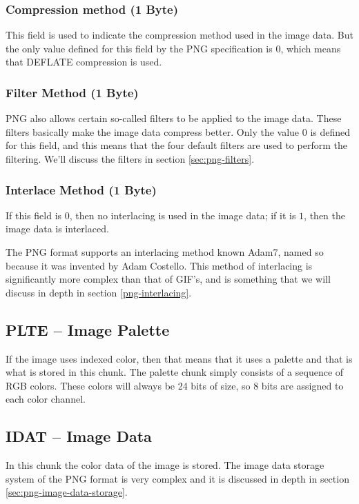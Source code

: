 \subsubsection*{Compression method (1 Byte)}

This field is used to indicate the compression method used in the
image data. But the only value defined for this field by the PNG
specification is $0$, which means that DEFLATE compression is used.

\subsubsection*{Filter Method (1 Byte)}

PNG also allows certain so-called filters to be applied to the image
data. These filters basically make the image data compress
better. Only the value $0$ is defined for this field, and this means
that the four default filters are used to perform the filtering. We'll
discuss the filters in section \ref{sec:png-filters}.

\subsubsection*{Interlace Method (1 Byte)}

If this field is $0$, then no interlacing is used in the image data; if it
is $1$, then the image data is interlaced.

The PNG format supports an interlacing method known Adam7, named so
because it was invented by Adam Costello. This method of interlacing
is significantly more complex than that of GIF's, and is something
that we will discuss in depth in section \ref{png-interlacing}.

\subsection{PLTE -- Image Palette}

If the image uses indexed color, then that means that it uses a
palette and that is what is stored in this chunk. The palette chunk
simply consists of a sequence of RGB colors. These colors will always be
24 bits of size, so 8 bits are assigned to each color channel.

\subsection{IDAT -- Image Data}

In this chunk the color data of the image is stored. The image data
storage system of the PNG format is very complex and it is discussed
in depth in section \ref{sec:png-image-data-storage}.

